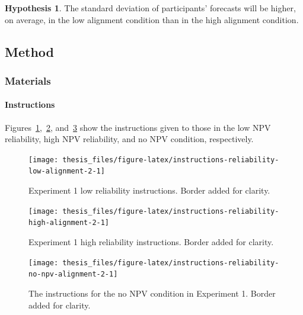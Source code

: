 \documentclass[a4paper, nobind, dvipsnames]{templates/ociamthesis}
\theoremstyle{definition}
\theoremstyle{definition}
\theoremstyle{definition}
\theoremstyle{definition}
\newtheorem{hypothesis}{Hypothesis}[chapter]
\theoremstyle{remark}
\begin{document}
\begin{hypothesis}
\protect\hypertarget{hyp:forecasting-sd-alignment-alignment-2}{}{\label{hyp:forecasting-sd-alignment-alignment-2} }The standard deviation of participants' forecasts will be higher, on average,
in the low alignment condition than in the high alignment condition.
\end{hypothesis}

\subsection{Method}

\subsubsection{Materials}

\hypertarget{instructions-materials-alignment-2-appendix}{%
\paragraph{Instructions}\label{instructions-materials-alignment-2-appendix}}

Figures~\ref{fig:instructions-reliability-low-alignment-2},~\ref{fig:instructions-reliability-high-alignment-2},
and~\ref{fig:instructions-reliability-no-npv-alignment-2} show the instructions
given to those in the low NPV reliability, high NPV reliability, and no NPV
condition, respectively.



\begin{figure}
\texttt{[image: thesis\_files/figure-latex/instructions-reliability-low-alignment-2-1]} \caption{Experiment 1 low reliability instructions. Border added for clarity.}\label{fig:instructions-reliability-low-alignment-2}
\end{figure}



\begin{figure}
\texttt{[image: thesis\_files/figure-latex/instructions-reliability-high-alignment-2-1]} \caption{Experiment 1 high reliability instructions. Border added for clarity.}\label{fig:instructions-reliability-high-alignment-2}
\end{figure}



\begin{figure}
\texttt{[image: thesis\_files/figure-latex/instructions-reliability-no-npv-alignment-2-1]} \caption{The instructions for the no NPV condition in Experiment 1. Border added for clarity.}\label{fig:instructions-reliability-no-npv-alignment-2}
\end{figure}
\end{document}
